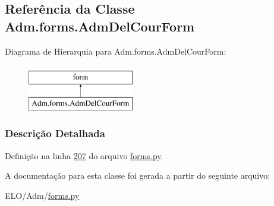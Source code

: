 \hypertarget{classAdm_1_1forms_1_1AdmDelCourForm}{\subsection{Referência da Classe Adm.\-forms.\-Adm\-Del\-Cour\-Form}
\label{classAdm_1_1forms_1_1AdmDelCourForm}
}
Diagrama de Hierarquia para Adm.\-forms.\-Adm\-Del\-Cour\-Form\-:\begin{figure}[H]
\begin{center}
\leavevmode
\includegraphics[height=2.000000cm]{da/d13/classAdm_1_1forms_1_1AdmDelCourForm}
\end{center}
\end{figure}


\subsubsection{Descrição Detalhada}


Definição na linha \hyperlink{Adm_2forms_8py_source_l00207}{207} do arquivo \hyperlink{Adm_2forms_8py_source}{forms.\-py}.



A documentação para esta classe foi gerada a partir do seguinte arquivo\-:\begin{DoxyCompactItemize}
\item 
E\-L\-O/\-Adm/\hyperlink{Adm_2forms_8py}{forms.\-py}\end{DoxyCompactItemize}
